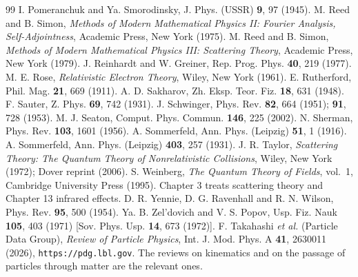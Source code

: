 \documentclass[11pt,a4paper]{book}
\numberwithin{equation}{chapter}
\begin{document}
\begin{thebibliography}{99}
 I. Pomeranchuk and Ya. Smorodinsky, J. Phys. (USSR) \textbf{9}, 97 (1945).
 M. Reed and B. Simon, \emph{Methods of Modern Mathematical Physics II: Fourier Analysis, Self-Adjointness}, Academic Press, New York (1975).
 M. Reed and B. Simon, \emph{Methods of Modern Mathematical Physics III: Scattering Theory}, Academic Press, New York (1979).
 J. Reinhardt and W. Greiner, Rep. Prog. Phys. \textbf{40}, 219 (1977).
 M. E. Rose, \emph{Relativistic Electron Theory}, Wiley, New York (1961).
 E. Rutherford, Phil. Mag. \textbf{21}, 669 (1911).
 A. D. Sakharov, Zh. Eksp. Teor. Fiz. \textbf{18}, 631 (1948).
 F. Sauter, Z. Phys. \textbf{69}, 742 (1931).
 J. Schwinger, Phys. Rev. \textbf{82}, 664 (1951); \textbf{91}, 728 (1953).
 M. J. Seaton, Comput. Phys. Commun. \textbf{146}, 225 (2002).
 N. Sherman, Phys. Rev. \textbf{103}, 1601 (1956).
 A. Sommerfeld, Ann. Phys. (Leipzig) \textbf{51}, 1 (1916).
 A. Sommerfeld, Ann. Phys. (Leipzig) \textbf{403}, 257 (1931).
 J. R. Taylor, \emph{Scattering Theory: The Quantum Theory of Nonrelativistic Collisions}, Wiley, New York (1972); Dover reprint (2006).
 S. Weinberg, \emph{The Quantum Theory of Fields}, vol.~1, Cambridge University Press (1995). Chapter 3 treats scattering theory and Chapter 13 infrared effects.
 D. R. Yennie, D. G. Ravenhall and R. N. Wilson, Phys. Rev. \textbf{95}, 500 (1954).
 Ya. B. Zel'dovich and V. S. Popov, Usp. Fiz. Nauk \textbf{105}, 403 (1971) [Sov. Phys. Usp. \textbf{14}, 673 (1972)].
 F. Takahashi \emph{et al.} (Particle Data Group), \emph{Review of Particle Physics}, Int. J. Mod. Phys. A \textbf{41}, 2630011 (2026), \texttt{https://pdg.lbl.gov}. The reviews on kinematics and on the passage of particles through matter are the relevant ones.
\end{thebibliography}
\end{document}
